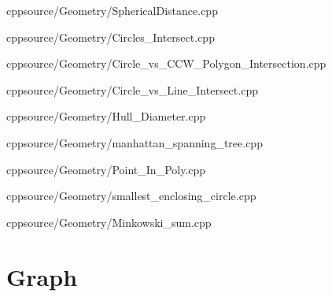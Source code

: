 \documentclass[portrait, 8pt, a4paper, oneside, twocolumn]{extarticle}
\begin{document}
%
%
%
%

%

{cpp}{source/Geometry/SphericalDistance.cpp}

{}{}
{cpp}{source/Geometry/Circles_Intersect.cpp}

{}{}
{cpp}{source/Geometry/Circle_vs_CCW_Polygon_Intersection.cpp}

{}{}
{cpp}{source/Geometry/Circle_vs_Line_Intersect.cpp}

{}{}
{cpp}{source/Geometry/Hull_Diameter.cpp}

{cpp}{source/Geometry/manhattan_spanning_tree.cpp}

{}{}
{cpp}{source/Geometry/Point_In_Poly.cpp}

{}{}
{cpp}{source/Geometry/smallest_enclosing_circle.cpp}

{}{}
{cpp}{source/Geometry/Minkowski_sum.cpp}

















\section{Graph}
\end{document}
